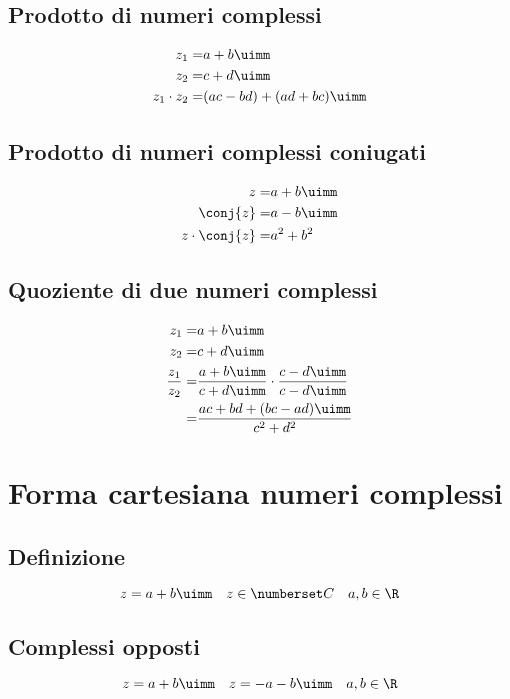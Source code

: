 \section{Prodotto di numeri complessi}
\begin{align}
z_1=&a+b\uimm\\
z_2=&c+d\uimm\\
z_1\cdot z_2=&(ac-bd)+(ad+bc)\uimm
\end{align}
\section{Prodotto di numeri complessi coniugati}
\begin{align}
z=&a+b\uimm\\
\conj{z}=&a-b\uimm\\
z\cdot\conj{z}=&a^2+b^2
\end{align}
\section{Quoziente di due numeri complessi}
\begin{align}
z_1=&a+b\uimm\\
z_2=&c+d\uimm\\
\dfrac{z_1}{z_2}=&\dfrac{a+b\uimm}{c+d\uimm}\cdot\dfrac{c-d\uimm}{c-d\uimm}\\
=&\dfrac{ac+bd+(bc-ad)\uimm}{c^2+d^2}
\end{align}
\chapter{Forma cartesiana numeri complessi}
\section{Definizione}
\begin{equation}
z=a+b\uimm\quad z\in\Co\quad a,b\in\R
\end{equation} 
\begin{center}
	
\end{center}
\section{Complessi opposti}
\begin{equation}
z=a+b\uimm\quad\-z=-a-b\uimm\quad a,b\in\R
\end{equation}
\begin{center}
	
\end{center}
